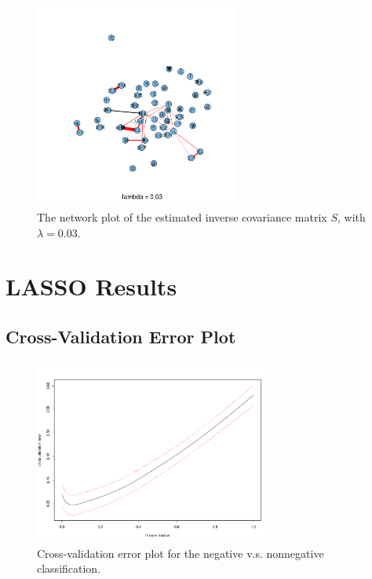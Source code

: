 \documentclass[11pt]{article}
\newcommand{\1}[1]{{\mathbf 1}\left\{#1\right\}}        %
\begin{document}
\begin{center}
\begin{figure}[!h]
   \centering
   \includegraphics[width=0.6\textwidth]{../gLassoResults/glasso6.png} 
      \caption{The network plot of the estimated inverse covariance matrix $S$, with $\lambda = 0.03$.}
   \label{fig:glasso6}
\end{figure}
\end{center}

\clearpage

\section{LASSO Results}

\subsection{Cross-Validation Error Plot}\label{asec:cverror}

\begin{center}
\begin{figure}[!h]
   \centering
   \includegraphics[width=0.7\textwidth]{../lassoResults/CVNegErr.pdf} 
      \caption{Cross-validation error plot for the negative v.s. nonnegative classification. }
   \label{fig:cvplotneg}
\end{figure}
\end{center}
\end{document}
